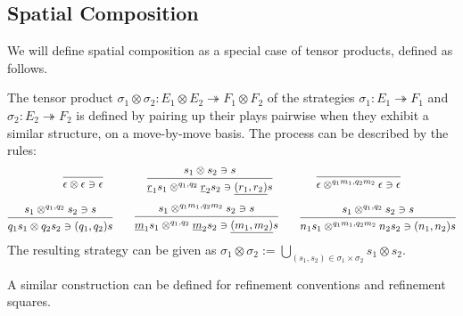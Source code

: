 \documentclass[acmsmall,screen,review,nonacm]{acmart}
\begin{document}
\subsection{Spatial Composition}

We will define spatial composition as a special case of tensor products,
defined as follows.

\begin{definition}
The tensor product
$\sigma_1 \otimes \sigma_2 : E_1 \otimes E_2 \twoheadrightarrow F_1 \otimes F_2$
of the strategies
$\sigma_1 : E_1 \twoheadrightarrow F_1$ and
$\sigma_2 : E_2 \twoheadrightarrow F_2$
is defined by pairing up their plays pairwise
when they exhibit a similar structure, on a move-by-move basis.
The process can be described by the rules:
\begin{gather*}
  \qquad
  \begin{prooftree}
    \infer0{\epsilon \otimes \epsilon &\ni \epsilon}
  \end{prooftree}
  \qquad\qquad
  \begin{prooftree}
    \hypo{s_1 \otimes s_2 \ni s}
    \infer1{
      \underline{r}_1 s_1 \otimes^{q_1,q_2} \underline{r}_2 s_2 \ni
      \underline{(r_1, r_2)} s
    }
  \end{prooftree}
  \qquad\qquad
  \begin{prooftree}
    \infer0{\epsilon \otimes^{q_1m_1,q_2m_2} \epsilon \ni \epsilon}
  \end{prooftree}
  \qquad
  \\[1ex]
  \begin{prooftree}
    \hypo{s_1 \otimes^{q_1,q_2} s_2 \ni s}
    \infer1{q_1 s_1 \otimes q_2 s_2 \ni (q_1, q_2) s}
  \end{prooftree}
  \qquad
  \begin{prooftree}
    \hypo{s_1 \otimes^{q_1m_1,q_2m_2} s_2 \ni s}
    \infer1{
      \underline{m}_1 s_1 \otimes^{q_1,q_2} \underline{m}_2 s_2 \ni
      \underline{(m_1, m_2)} s
    }
  \end{prooftree}
  \qquad
  \begin{prooftree}
    \hypo{s_1 \otimes^{q_1,q_2} s_2 \ni s}
    \infer1{n_1s_1 \otimes^{q_1m_1,q_2m_2} n_2s_2 \ni (n_1,n_2)s}
  \end{prooftree}
\end{gather*}
The resulting strategy can be given as
$\sigma_1 \otimes \sigma_2 :=
 \bigcup_{(s_1, s_2) \in \sigma_1 \times \sigma_2} s_1 \otimes s_2$.
\end{definition}

A similar construction can be defined for
refinement conventions and refinement squares.
\end{document}
